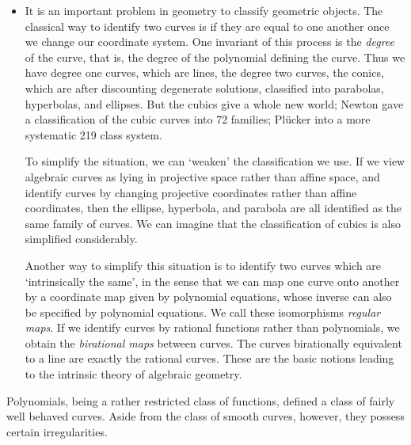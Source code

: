 \begin{itemize}
    \item It is an important problem in geometry to classify geometric objects. The classical way to identify two curves is if they are equal to one another once we change our coordinate system. One invariant of this process is the \emph{degree} of the curve, that is, the degree of the polynomial defining the curve. Thus we have degree one curves, which are lines, the degree two curves, the conics, which are after discounting degenerate solutions, classified into parabolas, hyperbolas, and ellipses. But the cubics give a whole new world; Newton gave a classification of the cubic curves into 72 families; Pl\"{u}cker into a more systematic 219 class system.

    To simplify the situation, we can `weaken' the classification we use. If we view algebraic curves as lying in projective space rather than affine space, and identify curves by changing projective coordinates rather than affine coordinates, then the ellipse, hyperbola, and parabola are all identified as the same family of curves. We can imagine that the classification of cubics is also simplified considerably.

    Another way to simplify this situation is to identify two curves which are `intrinsically the same', in the sense that we can map one curve onto another by a coordinate map given by polynomial equations, whose inverse can also be specified by polynomial equations. We call these isomorphisms \emph{regular maps}. If we identify curves by rational functions rather than polynomials, we obtain the \emph{birational maps} between curves. The curves birationally equivalent to a line are exactly the rational curves. These are the basic notions leading to the intrinsic theory of algebraic geometry.
\end{itemize}
%
Polynomials, being a rather restricted class of functions, defined a class of fairly well behaved curves. Aside from the class of smooth curves, however, they possess certain irregularities.
%
